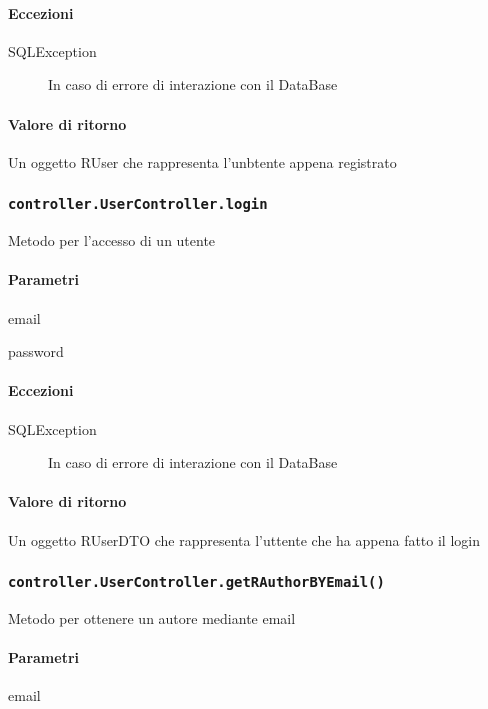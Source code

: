 \paragraph{Eccezioni}
\begin{description}
\item[SQLException] In caso di errore di interazione con il DataBase
\end{description}
\paragraph{Valore di ritorno}
Un oggetto RUser che rappresenta l'unbtente appena registrato

\subsubsection{\texttt{controller.UserController.login}}
Metodo per l'accesso di un utente
\paragraph{Parametri}
\begin{description}
\item email
\item password
\end{description}
\paragraph{Eccezioni}
\begin{description}
\item[SQLException] In caso di errore di interazione con il DataBase
\end{description}
\paragraph{Valore di ritorno}
Un oggetto RUserDTO che rappresenta l'uttente che ha appena fatto il login


\subsubsection{\texttt{controller.UserController.getRAuthorBYEmail()}}
Metodo per ottenere un autore mediante email
\paragraph{Parametri}
\begin{description}
\item email
\end{description}
